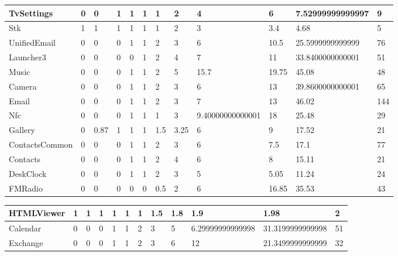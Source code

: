\documentclass[a4paper]{article}
\begin{document}
\begin{tabular}{|l|l|l|l|l|l|l|l|l|l|l|l|}
TvSettings&0&0&1&1&1&1&2&4&6&7.52999999999997&9\\
\hline
Stk&1&1&1&1&1&1&2&3&3.4&4.68&5\\
\hline
UnifiedEmail&0&0&0&1&1&2&3&6&10.5&25.5999999999999&76\\
\hline
Launcher3&0&0&0&0&1&2&4&7&11&33.8400000000001&51\\
\hline
Music&0&0&0&1&1&2&5&15.7&19.75&45.08&48\\
\hline
Camera&0&0&0&1&1&2&3&6&13&39.8600000000001&65\\
\hline
Email&0&0&0&1&1&2&3&7&13&46.02&144\\
\hline
Nfc&0&0&0&1&1&1&3&9.40000000000001&18&25.48&29\\
\hline
Gallery&0&0.87&1&1&1&1.5&3.25&6&9&17.52&21\\
\hline
ContactsCommon&0&0&0&1&1&2&3&6&7.5&17.1&77\\
\hline
Contacts&0&0&0&1&1&2&4&6&8&15.11&21\\
\hline
DeskClock&0&0&0&1&1&2&3&5&5.05&11.24&24\\
\hline
FMRadio&0&0&0&0&0&0.5&2&6&16.85&35.53&43\\
\hline
\end{tabular}
\newline
\begin{tabular}{|l|l|l|l|l|l|l|l|l|l|l|l|}
\hline
HTMLViewer&1&1&1&1&1&1&1.5&1.8&1.9&1.98&2\\
\hline
Calendar&0&0&0&1&1&2&3&5&6.29999999999998&31.3199999999998&51\\
\hline
Exchange&0&0&0&1&1&2&3&6&12&21.3499999999999&32\\
\hline
\end{tabular}
\end{document}
